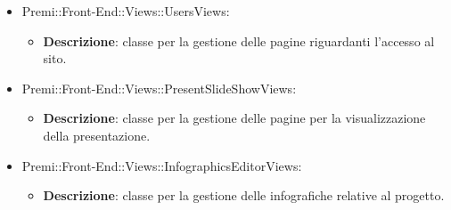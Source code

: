 	\begin{itemize}
		\item Premi::Front-End::Views::UsersViews:
			\begin{itemize}
				\item \textbf{Descrizione}: classe per la gestione delle pagine riguardanti l'accesso al sito.
			\end{itemize}

		\item Premi::Front-End::Views::PresentSlideShowViews:
			\begin{itemize}
				\item \textbf{Descrizione}: classe per la gestione delle pagine per la visualizzazione della presentazione.
			\end{itemize}

		\item Premi::Front-End::Views::InfographicsEditorViews:
		\begin{itemize}
			\item \textbf{Descrizione}: classe per la gestione delle infografiche relative al progetto.
		\end{itemize}
	\end{itemize}

